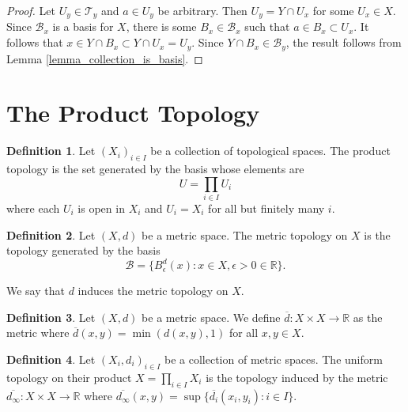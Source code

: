 \documentclass{report}
\theoremstyle{definition}
\newtheorem{definition}{Definition}[section]
\theoremstyle{remark}
\newcommand{\R}{\mathbb{R}}
\newcommand{\set}[1]{\{#1\}}
\newcommand{\prt}[1]{\mathcal{#1}}
\let\oldmin\min
\renewcommand{\min}[1]{\oldmin \left( #1 \right)}
\begin{document}
\begin{proof}
    Let $U_y \in \prt{T}_y$ and $a \in U_y$ be arbitrary. Then $U_y = Y \cap U_x$ for some $U_x \in X$. Since $\prt{B}_x$ is a basis for $X$, there is some $B_x \in \prt{B}_x$ such that $a \in B_x \subset U_x$. It follows that $x \in Y \cap B_x \subset Y \cap U_x = U_y$. Since $Y \cap B_x \in \prt{B}_y$, the result follows from Lemma \ref{lemma_collection_is_basis}.
\end{proof}

\setcounter{section}{18}
\section{The Product Topology}

\begin{definition} \label{def_productTopology}
    Let $(X_i)_{i \in I}$ be a collection of topological spaces. The product topology is the set generated by the basis whose elements are 
    \begin{equation*}
        U = \prod_{i\in I} U_i
    \end{equation*} where each $U_i$ is open in $X_i$ and $U_i = X_i$ for all but finitely many $i$.
\end{definition}

\begin{definition} \label{def_metricTopology}
    Let $(X, d)$ be a metric space. The metric topology on $X$ is the topology generated by the basis 
    \begin{equation*}
        \prt{B} = \set{B_{\epsilon}^d(x) : x \in X, \epsilon > 0 \in \R}.
    \end{equation*}
    
    We say that $d$ induces the metric topology on $X$.
\end{definition}

\begin{definition}
    Let $(X, d)$ be a metric space. We define $\overline{d}: X \times X \to \R$ as the metric where $\overline{d}(x, y) = \min{d(x, y), 1}$ for all $x,y \in X$.
\end{definition}


\begin{definition}
   Let $(X_i, d_i)_{i \in I}$ be a collection of metric spaces. The uniform topology on their product $X = \prod_{i \in I} X_i$ is the topology induced by the metric $\overline{d_\infty}: X \times X \to \R$ where $\overline{d_\infty}(x, y) = \sup\set{\overline{d_i}(x_i, y_i) : i \in I}$.
\end{definition}
\end{document}
